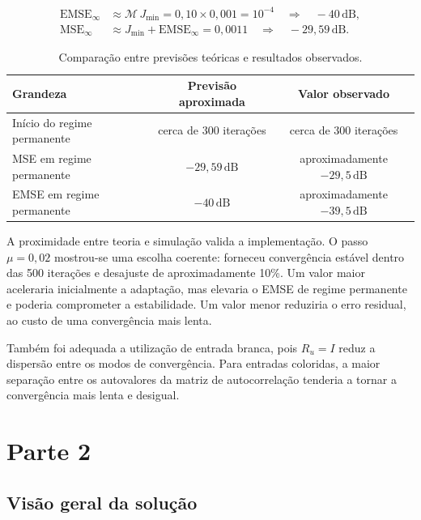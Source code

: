 \documentclass[11pt,a4paper,oneside]{report}
\begin{document}
\begin{align}
    \mathrm{EMSE}_{\infty}
    &\approx \mathcal{M}\,J_{\min}
      =0{,}10\times0{,}001=10^{-4}
      \quad\Rightarrow\quad -40\,\mathrm{dB},\\
    \mathrm{MSE}_{\infty}
    &\approx J_{\min}+\mathrm{EMSE}_{\infty}
      =0{,}0011
      \quad\Rightarrow\quad -29{,}59\,\mathrm{dB}.
\end{align}

\begin{table}[H]
    \centering
    \caption{Comparação entre previsões teóricas e resultados observados.}
    \begin{tabular}{lcc}
        \toprule
        \textbf{Grandeza} & \textbf{Previsão aproximada} & \textbf{Valor observado} \\
        \midrule
        Início do regime permanente & cerca de 300 iterações & cerca de 300 iterações \\
        MSE em regime permanente & \(-29{,}59\,\mathrm{dB}\) & aproximadamente \(-29{,}5\,\mathrm{dB}\) \\
        EMSE em regime permanente & \(-40\,\mathrm{dB}\) & aproximadamente \(-39{,}5\,\mathrm{dB}\) \\
        \bottomrule
    \end{tabular}
\end{table}

A proximidade entre teoria e simulação valida a implementação. O passo \(\mu=0{,}02\) mostrou-se uma escolha
coerente: forneceu convergência estável dentro das 500 iterações e desajuste de aproximadamente 10\%. Um valor
maior aceleraria inicialmente a adaptação, mas elevaria o EMSE de regime permanente e poderia comprometer a
estabilidade. Um valor menor reduziria o erro residual, ao custo de uma convergência mais lenta.

Também foi adequada a utilização de entrada branca, pois \(R_u=I\) reduz a dispersão entre os modos
de convergência. Para entradas coloridas, a maior separação entre os autovalores da matriz de autocorrelação
tenderia a tornar a convergência mais lenta e desigual.

\chapter{Parte 2}

\section{Visão geral da solução}
\end{document}

